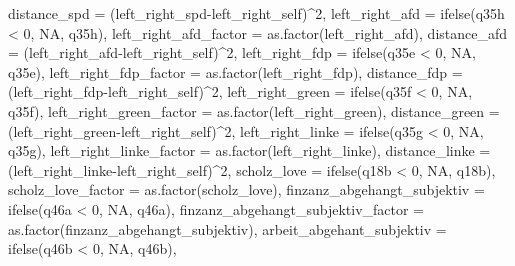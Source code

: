 \documentclass[
]{article}
\newenvironment{Shaded}{\begin{snugshade}}{\end{snugshade}}
\newcommand{\AttributeTok}[1]{\textcolor[rgb]{0.77,0.63,0.00}{#1}}
\newcommand{\ConstantTok}[1]{\textcolor[rgb]{0.00,0.00,0.00}{#1}}
\newcommand{\DecValTok}[1]{\textcolor[rgb]{0.00,0.00,0.81}{#1}}
\newcommand{\FunctionTok}[1]{\textcolor[rgb]{0.00,0.00,0.00}{#1}}
\newcommand{\NormalTok}[1]{#1}
\newcommand{\SpecialCharTok}[1]{\textcolor[rgb]{0.00,0.00,0.00}{#1}}
\begin{document}
\begin{Shaded}
\begin{Highlighting}[]
         \AttributeTok{distance\_spd =}\NormalTok{ (left\_right\_spd}\SpecialCharTok{{-}}\NormalTok{left\_right\_self)}\SpecialCharTok{\^{}}\DecValTok{2}\NormalTok{,}
         \AttributeTok{left\_right\_afd =} \FunctionTok{ifelse}\NormalTok{(q35h }\SpecialCharTok{\textless{}} \DecValTok{0}\NormalTok{, }\ConstantTok{NA}\NormalTok{, q35h),}
         \AttributeTok{left\_right\_afd\_factor =} \FunctionTok{as.factor}\NormalTok{(left\_right\_afd),}
         \AttributeTok{distance\_afd =}\NormalTok{ (left\_right\_afd}\SpecialCharTok{{-}}\NormalTok{left\_right\_self)}\SpecialCharTok{\^{}}\DecValTok{2}\NormalTok{,}
         \AttributeTok{left\_right\_fdp =} \FunctionTok{ifelse}\NormalTok{(q35e }\SpecialCharTok{\textless{}} \DecValTok{0}\NormalTok{, }\ConstantTok{NA}\NormalTok{, q35e),}
         \AttributeTok{left\_right\_fdp\_factor =} \FunctionTok{as.factor}\NormalTok{(left\_right\_fdp),}
         \AttributeTok{distance\_fdp =}\NormalTok{ (left\_right\_fdp}\SpecialCharTok{{-}}\NormalTok{left\_right\_self)}\SpecialCharTok{\^{}}\DecValTok{2}\NormalTok{,}
         \AttributeTok{left\_right\_green =} \FunctionTok{ifelse}\NormalTok{(q35f }\SpecialCharTok{\textless{}} \DecValTok{0}\NormalTok{, }\ConstantTok{NA}\NormalTok{, q35f),}
         \AttributeTok{left\_right\_green\_factor =} \FunctionTok{as.factor}\NormalTok{(left\_right\_green),}
         \AttributeTok{distance\_green =}\NormalTok{ (left\_right\_green}\SpecialCharTok{{-}}\NormalTok{left\_right\_self)}\SpecialCharTok{\^{}}\DecValTok{2}\NormalTok{,}
         \AttributeTok{left\_right\_linke =} \FunctionTok{ifelse}\NormalTok{(q35g }\SpecialCharTok{\textless{}} \DecValTok{0}\NormalTok{, }\ConstantTok{NA}\NormalTok{, q35g),}
         \AttributeTok{left\_right\_linke\_factor =} \FunctionTok{as.factor}\NormalTok{(left\_right\_linke),}
         \AttributeTok{distance\_linke =}\NormalTok{ (left\_right\_linke}\SpecialCharTok{{-}}\NormalTok{left\_right\_self)}\SpecialCharTok{\^{}}\DecValTok{2}\NormalTok{,}
         \AttributeTok{scholz\_love =} \FunctionTok{ifelse}\NormalTok{(q18b }\SpecialCharTok{\textless{}} \DecValTok{0}\NormalTok{, }\ConstantTok{NA}\NormalTok{, q18b),}
         \AttributeTok{scholz\_love\_factor =} \FunctionTok{as.factor}\NormalTok{(scholz\_love),}
         \AttributeTok{finzanz\_abgehangt\_subjektiv =} \FunctionTok{ifelse}\NormalTok{(q46a }\SpecialCharTok{\textless{}} \DecValTok{0}\NormalTok{, }\ConstantTok{NA}\NormalTok{, q46a),}
         \AttributeTok{finzanz\_abgehangt\_subjektiv\_factor =} \FunctionTok{as.factor}\NormalTok{(finzanz\_abgehangt\_subjektiv),}
         \AttributeTok{arbeit\_abgehant\_subjektiv =} \FunctionTok{ifelse}\NormalTok{(q46b }\SpecialCharTok{\textless{}} \DecValTok{0}\NormalTok{, }\ConstantTok{NA}\NormalTok{, q46b),}

\end{Highlighting}
\end{Shaded}
\end{document}

